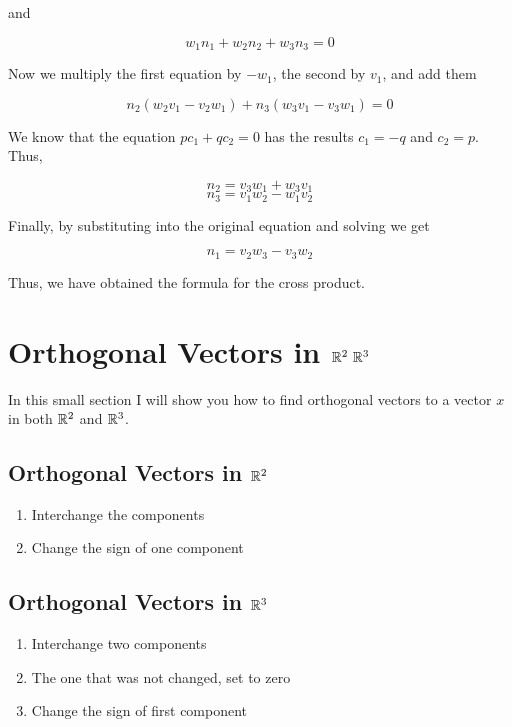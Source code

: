 and 

\[
    w_1 n_1 + w_2 n_2 + w_3 n_3 = 0 
\]

Now we multiply the first equation by \(-w_1\), the second by \(v_1\), and add them 

\[
    n_2(w_2 v_1 - v_2 w_1) + n_3(w_3 v_1 - v_3 w_1) = 0  
\]

We know that the equation \(p c_1 + q c_2 = 0\) has the results \(c_1 = -q\) and \(c_2 = p\). Thus, 

\[
    n_2 =  v_3 w_1 + w_3 v_1
\]
\[
    n_3 = v_1 w_2 - w_1 v_2  
\]

Finally, by substituting into the original equation and solving we get 

\[
    n_1 = v_2 w_3 - v_3 w_2 
\]

Thus, we have obtained the formula for the cross product. 

\QED

\section{Orthogonal Vectors in \texorpdfstring{\(\mathbb{R}^2\ \mathbb{R}^3\)}{}}

In this small section I will show you how to find orthogonal vectors to a vector \(x\) in both \(\mathbb{R}^2\) and \(\mathbb{R}^3\).

\subsection{Orthogonal Vectors in \texorpdfstring{\(\mathbb{R}^2\)}{}}

\begin{enumerate}

	\item Interchange the components

	\item Change the sign of one component

\end{enumerate}

\subsection{Orthogonal Vectors in \texorpdfstring{\(\mathbb{R}^3\)}{}}

\begin{enumerate}

	\item Interchange two components

	\item The one that was not changed, set to zero

	\item Change the sign of first component

\end{enumerate}

